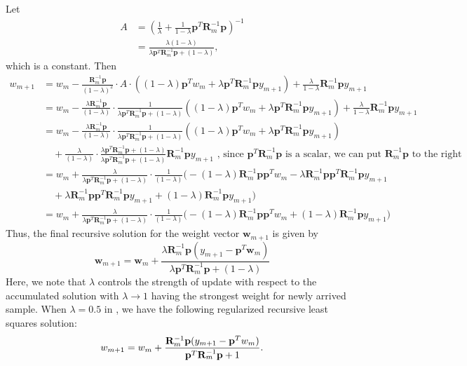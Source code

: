 Let 
\begin{align*}
	A &= \left( \frac{1}{\lambda} + \frac{1}{1 - \lambda} \mathbf{p}^T \mathbf{R}_m^{-1} \mathbf{p} \right)^{-1} \\
	  &= \frac{\lambda(1-\lambda)}{\lambda \mathbf{p}^T \mathbf{R}_m^{-1} \mathbf{p}+(1-\lambda)},
\end{align*}
which is a constant. Then 
\begin{align*}
	w_{m+1} &= w_m - \frac{\mathbf{R}_m^{-1} \mathbf{p}}{(1-\lambda)^2} \cdot A \cdot \left((1-\lambda)\mathbf{p}^T w_m + \lambda \mathbf{p}^T \mathbf{R}_m^{-1}\mathbf{p} y_{m+1}\right)+ \frac{\lambda}{1 - \lambda} \mathbf{R}_m^{-1} \mathbf{p} y_{m+1}\\
			&= w_m - \frac{\lambda \mathbf{R}_m^{-1} \mathbf{p}}{(1-\lambda)} \cdot \frac{1}{\lambda \mathbf{p}^T \mathbf{R}_m^{-1} \mathbf{p}+(1-\lambda)}\left((1-\lambda)\mathbf{p}^T w_m + \lambda \mathbf{p}^T \mathbf{R}_m^{-1}\mathbf{p} y_{m+1}\right) + \frac{\lambda}{1 - \lambda} \mathbf{R}_m^{-1} \mathbf{p} y_{m+1}\\
			&= w_m - \frac{\lambda \mathbf{R}_m^{-1} \mathbf{p}}{(1-\lambda)} \cdot \frac{1}{\lambda \mathbf{p}^T \mathbf{R}_m^{-1} \mathbf{p}+(1-\lambda)}\left((1-\lambda)\mathbf{p}^T w_m + \lambda \mathbf{p}^T \mathbf{R}_m^{-1}\mathbf{p} y_{m+1}\right) \\ 
			&\quad +\frac{\lambda}{(1 - \lambda)}\cdot \frac{\lambda \mathbf{p}^T \mathbf{R}_m^{-1} \mathbf{p}+(1-\lambda)}{\lambda \mathbf{p}^T \mathbf{R}_m^{-1} \mathbf{p}+(1-\lambda)} \mathbf{R}_m^{-1} \mathbf{p} y_{m+1} \,\, \text{, since $\mathbf{p}^T \mathbf{R}_m^{-1} \mathbf{p}$ is a scalar, we can put $\mathbf{R}_m^{-1} \mathbf{p}$ to the right}\\
			&= w_m + \frac{\lambda}{\lambda \mathbf{p}^T \mathbf{R}_m^{-1} \mathbf{p}+(1-\lambda)}\cdot\frac{1}{(1-\lambda)}\big(-(1-\lambda)\mathbf{R}_m^{-1}\mathbf{p}\mathbf{p}^T w_m - \lambda \mathbf{R}_m^{-1}\mathbf{p}\mathbf{p}^T\mathbf{R}_m^{-1}\mathbf{p}y_{m+1}\\
			&\quad + \lambda \mathbf{R}_m^{-1}\mathbf{p}\mathbf{p}^T\mathbf{R}_m^{-1}\mathbf{p}y_{m+1} + (1-\lambda)\mathbf{R}_m^{-1}\mathbf{p}y_{m+1}\big)\\
			&= w_m + \frac{\lambda}{\lambda \mathbf{p}^T \mathbf{R}_m^{-1} \mathbf{p}+(1-\lambda)}\cdot\frac{1}{(1-\lambda)}\big(-(1-\lambda)\mathbf{R}_m^{-1}\mathbf{p}\mathbf{p}^T w_m + (1-\lambda)\mathbf{R}_m^{-1}\mathbf{p}y_{m+1}\big)
\end{align*}
Thus, the final recursive solution for the weight vector \(\mathbf{w}_{m+1}\) is given by
\[
\mathbf{w}_{m+1} = \mathbf{w}_m + \frac{\lambda \mathbf{R}_m^{-1} \mathbf{p} (y_{m+1} - \mathbf{p}^T \mathbf{w}_m)}{\lambda \mathbf{p}^T \mathbf{R}_m^{-1} \mathbf{p} + (1 - \lambda)}
\]
Here, we note that $\lambda$ controls the strength of update with respect to the accumulated solution with $\lambda \to 1$ having the strongest weight for newly arrived sample. When $\lambda = 0.5$ in , we have the following regularized recursive least squares solution:
\begin{align*}
	w_{m+1} = w_m + \frac{\mathbf{R}_m^{-1} {\mathbf{p}} (y_{m+1} - {\mathbf{p}}^T w_m)}{{\mathbf{p}}^T \mathbf{R}_m^{-1} {\mathbf{p}} + 1}. 
\end{align*}



